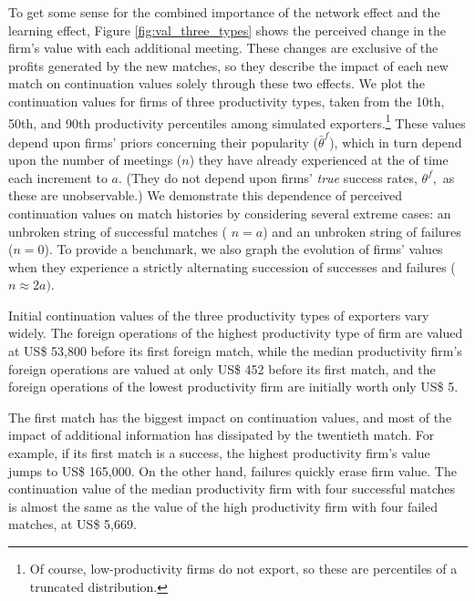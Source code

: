 \documentclass[12pt]{article}
\begin{document}
To get some sense for the combined importance of the network effect and the
learning effect, Figure \ref{fig:val_three_types} shows the perceived change
in the firm's value with each additional meeting. These changes are
exclusive of the profits generated by the new matches, so they describe the
impact of each new match on continuation values solely through these two
effects. We plot the continuation values for firms of three productivity
types, taken from the 10th, 50th, and 90th productivity percentiles among
simulated exporters.\footnote{%
Of course, low-productivity firms do not export, so these are percentiles
of a truncated distribution.\medskip} These values depend upon firms' priors
concerning their popularity ($\bar{\theta}^{f}$), which in turn depend upon
the number of meetings ($n$) they have already experienced at the of time
each increment to $a$. (They do not depend upon firms' \textit{true} success
rates, $\theta ^{f},$ as these are unobservable.) We demonstrate this
dependence of perceived continuation values on match histories by
considering several extreme cases: an unbroken string of successful matches (%
$n=a$) and an unbroken string of failures ($n=0$). To provide a benchmark,
we also graph the evolution of firms' values when they experience a strictly
alternating succession of successes and failures ($n\approx 2a)$.

Initial continuation values of the three productivity types of exporters
vary widely. The foreign operations of the highest productivity type of firm
are valued at US\$ 53,800 before its first foreign match, while the median
productivity firm's foreign operations are valued at only US\$ 452 before
its first match, and the foreign operations of the lowest productivity firm
are initially worth only US\$ 5.

The first match has the biggest impact on continuation values, and most of
the impact of additional information has dissipated by the twentieth match.
For example, if its first match is a success, the highest productivity
firm's value jumps to US\$ 165,000. On the other hand, failures quickly
erase firm value. The continuation value of the median productivity firm
with four successful matches is almost the same as the value of the high
productivity firm with four failed matches, at US\$ 5,669.
\end{document}
